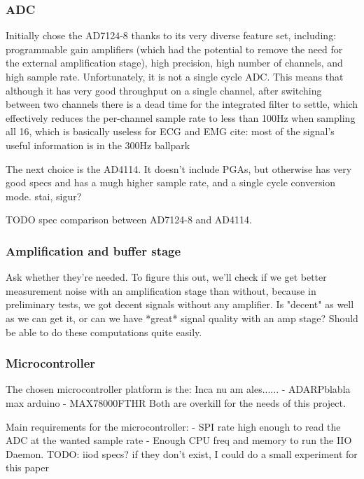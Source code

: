 \documentclass{thesis}
\newcommand{\todo}[1]{{\color{red}TODO: #1}}
\begin{document}
\subsubsection{ADC}

Initially chose the AD7124-8 thanks to its very diverse feature set, including: programmable gain amplifiers (which had the potential to remove the need for the external amplification stage), high precision, high number of channels, and high sample rate. Unfortunately, it is not a single cycle ADC. This means that although it has very good throughput on a single channel, after switching between two channels there is a dead time for the integrated filter to settle, which effectively reduces the per-channel sample rate to less than 100Hz when sampling all 16, which is basically useless for ECG and EMG {cite: most of the signal's useful information is in the 300Hz ballpark}

The next choice is the AD4114. It doesn't include PGAs, but otherwise has very good specs and has a mugh higher sample rate, and a single cycle conversion mode. {stai, sigur?}

TODO spec comparison between AD7124-8 and AD4114.

\subsubsection{Amplification and buffer stage}

Ask whether they're needed. To figure this out, we'll check if we get better measurement noise with an amplification stage than without, because in preliminary tests, we got decent signals without any amplifier. Is "decent" as well as we can get it, or can we have *great* signal quality with an amp stage? Should be able to do these computations quite easily.

\subsubsection{Microcontroller}

The chosen microcontroller platform is the: {Inca nu am ales......}
- ADARPblabla max arduino
- MAX78000FTHR
Both are overkill for the needs of this project.

Main requirements for the microcontroller:
- SPI rate high enough to read the ADC at the wanted sample rate
- Enough CPU freq and memory to run the IIO Daemon. \todo{iiod specs? if they don't exist, I could do a small experiment for this paper}
\end{document}
